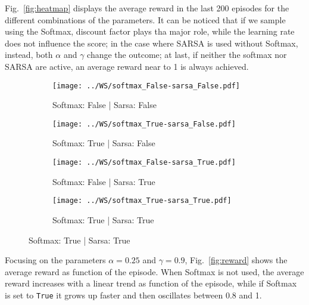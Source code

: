 \documentclass[a4paper,11pt]{article}
\begin{document}
Fig.~\ref{fig:heatmap} displays the average reward in the last 200 episodes for the different combinations of the parameters. It can be noticed that if we sample using the Softmax, discount factor plays tha major role, while the learning rate does not influence the score; in the case where SARSA is used without Softmax, instead, both $\alpha$ and $\gamma$ change the outcome; at last, if neither the softmax nor SARSA are active, an average reward near to 1 is always achieved.

\begin{figure}[htp]
  \centering
  \caption{Heatmaps of the average reward in the last 200 episodes for different combinations of the parameters $\alpha$ and $\gamma$.}
  \label{fig:heatmap}
  \begin{subfigure}{.45\linewidth}
    \centering
    \texttt{[image: ../WS/softmax\_False-sarsa\_False.pdf]}
    \caption{Softmax: False | Sarsa: False}
  \end{subfigure}
  \begin{subfigure}{.45\linewidth}
    \centering
    \texttt{[image: ../WS/softmax\_True-sarsa\_False.pdf]}
    \caption{Softmax: True | Sarsa: False}
  \end{subfigure}
  \begin{subfigure}{.45\linewidth}
    \centering
    \texttt{[image: ../WS/softmax\_False-sarsa\_True.pdf]}
    \caption{Softmax: False | Sarsa: True}
  \end{subfigure}
  \begin{subfigure}{.45\linewidth}
    \centering
    \texttt{[image: ../WS/softmax\_True-sarsa\_True.pdf]}
    \caption{Softmax: True | Sarsa: True}
  \end{subfigure}
\end{figure}

Focusing on the parameters $\alpha=0.25$ and $\gamma=0.9$, Fig.~\ref{fig:reward} shows the average reward as function of the episode. When Softmax is not used, the average reward increases with a linear trend as function of the episode, while if Softmax is set to \texttt{True} it grows up faster and then oscillates between 0.8 and 1.
\end{document}
